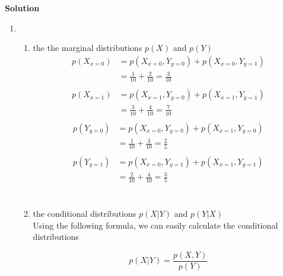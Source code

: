 \documentclass[12pt, fullpage,letterpaper]{article}
\newcommand{\solution}{\textbf{\large Solution}}
\begin{document}
\begin{enumerate}
\solution
		\begin{enumerate}
            \item~
            \begin{enumerate}
            \item the the marginal distributions $p(X)$ and $p(Y)$
            \[
            	\begin{split}
            		p(X_{x=0}) &= p(X_{x=0}, Y_{y=0}) + p(X_{x=0}, Y_{y=1}) 
            		\\
            		&= \frac{1}{10} + \frac{2}{10} = \frac{3}{10}
            		\\
            	\end{split}
			\]
			\[
            	\begin{split}
            		p(X_{x=1}) &= p(X_{x=1}, Y_{y=0}) + p(X_{x=1}, Y_{y=1}) 
            		\\
            		&= \frac{3}{10} + \frac{4}{10} = \frac{7}{10}
            		\\
            	\end{split}
			\]
            \[
            	\begin{split}
            		p(Y_{y=0}) &= p(X_{x=0}, Y_{y=0}) + p(X_{x=1}, Y_{y=0}) 
            		\\
            		&= \frac{1}{10} + \frac{3}{10} = \frac{2}{5}
            		\\
            	\end{split}
			\]
            \[
            	\begin{split}
            		p(Y_{y=1}) &= p(X_{x=0}, Y_{y=1}) + p(X_{x=1}, Y_{y=1}) 
            		\\
            		&= \frac{2}{10} + \frac{4}{10} = \frac{3}{5}
            		\\
            	\end{split}
			\]
			\\
			
            \item the conditional distributions $p(X|Y)$ and $p(Y|X)$
            \\
            
            Using the following formula, we can easily calculate the conditional distributions
            
            \[
            	p(X|Y) = \frac{p(X,Y)}{p(Y)} 
            \]
            \\
            

\end{enumerate}
\end{enumerate}
\end{enumerate}
\end{document}
